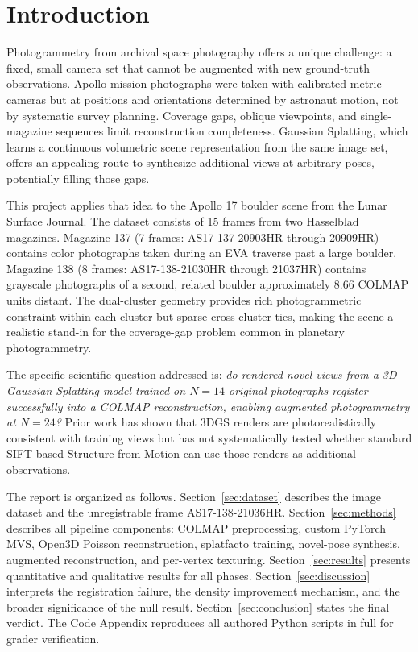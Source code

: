 \documentclass[12pt]{article}
\begin{document}
\section{Introduction}

Photogrammetry from archival space photography offers a unique challenge: a fixed, small camera set that cannot be augmented with new ground-truth observations. Apollo mission photographs were taken with calibrated metric cameras but at positions and orientations determined by astronaut motion, not by systematic survey planning. Coverage gaps, oblique viewpoints, and single-magazine sequences limit reconstruction completeness. Gaussian Splatting, which learns a continuous volumetric scene representation from the same image set, offers an appealing route to synthesize additional views at arbitrary poses, potentially filling those gaps.

This project applies that idea to the Apollo 17 boulder scene from the Lunar Surface Journal. The dataset consists of 15 frames from two Hasselblad magazines. Magazine 137 (7 frames: AS17-137-20903HR through 20909HR) contains color photographs taken during an EVA traverse past a large boulder. Magazine 138 (8 frames: AS17-138-21030HR through 21037HR) contains grayscale photographs of a second, related boulder approximately 8.66 COLMAP units distant. The dual-cluster geometry provides rich photogrammetric constraint within each cluster but sparse cross-cluster ties, making the scene a realistic stand-in for the coverage-gap problem common in planetary photogrammetry.

The specific scientific question addressed is: \textit{do rendered novel views from a 3D Gaussian Splatting model trained on $N{=}14$ original photographs register successfully into a COLMAP reconstruction, enabling augmented photogrammetry at $N{=}24$?} Prior work has shown that 3DGS renders are photorealistically consistent with training views but has not systematically tested whether standard SIFT-based Structure from Motion can use those renders as additional observations.

The report is organized as follows. Section~\ref{sec:dataset} describes the image dataset and the unregistrable frame AS17-138-21036HR. Section~\ref{sec:methods} describes all pipeline components: COLMAP preprocessing, custom PyTorch MVS, Open3D Poisson reconstruction, splatfacto training, novel-pose synthesis, augmented reconstruction, and per-vertex texturing. Section~\ref{sec:results} presents quantitative and qualitative results for all phases. Section~\ref{sec:discussion} interprets the registration failure, the density improvement mechanism, and the broader significance of the null result. Section~\ref{sec:conclusion} states the final verdict. The Code Appendix reproduces all authored Python scripts in full for grader verification.
\end{document}
